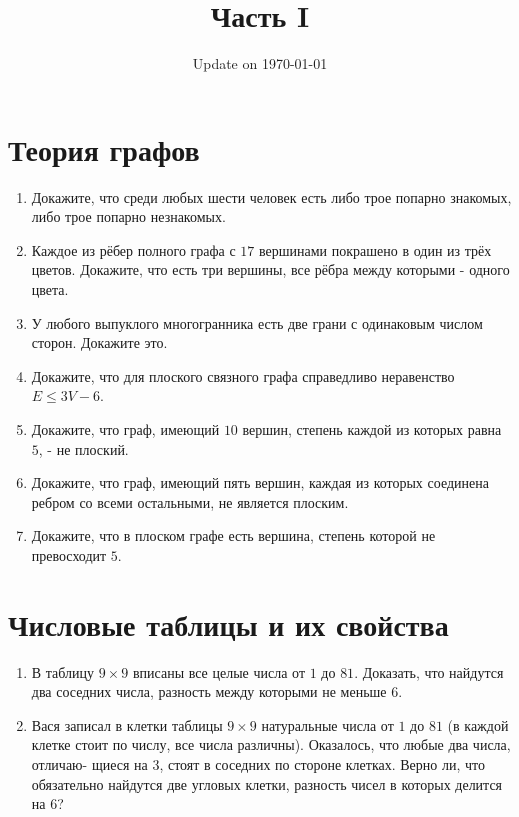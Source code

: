\documentclass[fleqn,oneside]{book}
\begin{document}
\fontsize{12}{12}\selectfont

\title{\bf \huge Часть I}
\date{Update on \today}
\maketitle 

\chapter*{Теория графов}

\begin{enumerate}
\item Докажите, что среди любых шести человек есть либо трое попарно знакомых, либо трое попарно незнакомых.

\item Каждое из рёбер полного графа с $17$ вершинами покрашено в один из трёх цветов. Докажите, что есть три вершины, все рёбра между которыми - одного цвета.

\item У любого выпуклого многогранника есть две грани с одинаковым числом сторон. Докажите это.

\item Докажите, что для плоского связного графа справедливо неравенство  $E \leqslant  3V - 6$.

\item Докажите, что граф, имеющий $10$ вершин, степень каждой из которых равна $5$, - не плоский.    

\item Докажите, что граф, имеющий пять вершин, каждая из которых соединена ребром со всеми остальными, не является плоским.

\item Докажите, что в плоском графе есть вершина, степень которой не превосходит $5$. 

\end{enumerate}


\chapter*{Числовые таблицы и их свойства}

\begin{enumerate}
\item В таблицу $9 \times 9$ вписаны все целые числа от $1$ до $81$. Доказать, что найдутся два соседних числа, разность между которыми не меньше $6$. 

\item Вася записал в клетки таблицы $9 \times 9$ натуральные числа от $1$ до $81$ (в каждой
клетке стоит по числу, все числа различны). Оказалось, что любые два числа, отличаю-
щиеся на $3$, стоят в соседних по стороне клетках. Верно ли, что обязательно найдутся две угловых клетки, разность чисел в которых делится на $6$?

\end{enumerate}
\end{document}
